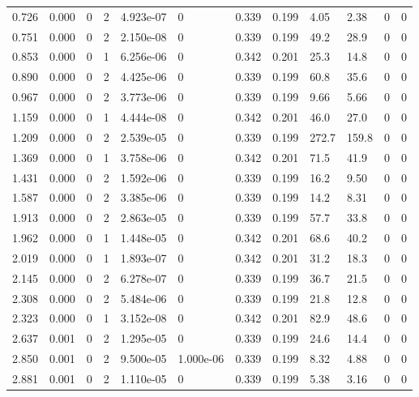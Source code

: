 \documentclass[preview]{standalone}
\begin{document}
{{\begin{tabular}{L{1.2cm}C{1.2cm} C{0.3cm}C{0.5cm} C{1.4cm}C{1.4cm} C{1.4cm}C{1.4cm} C{1.6cm}C{1.6cm} C{1.6cm}C{1.6cm}}
  0.726  &  0.000  & 0     &  2 &  4.923e-07  & 0  &  0.339&   0.199& 4.05 & 2.38   &  0 & 0  \\ 
  0.751  &  0.000  & 0     &  2 &  2.150e-08  & 0  &  0.339&   0.199& 49.2 & 28.9   &  0 & 0  \\ 
  0.853  &  0.000  & 0     &  1 &  6.256e-06  & 0  &  0.342&   0.201& 25.3 & 14.8   &  0 & 0  \\ 
  0.890  &  0.000  & 0     &  2 &  4.425e-06  & 0  &  0.339&   0.199& 60.8 & 35.6   &  0 & 0  \\ 
  0.967  &  0.000  & 0     &  2 &  3.773e-06  & 0  &  0.339&   0.199& 9.66 & 5.66   &  0 & 0  \\ 
  1.159  &  0.000  & 0     &  1 &  4.444e-08  & 0  &  0.342&   0.201& 46.0 & 27.0   &  0 & 0  \\ 
  1.209  &  0.000  & 0     &  2 &  2.539e-05  & 0  &  0.339&   0.199& 272.7 & 159.8   &  0 & 0  \\ 
  1.369  &  0.000  & 0     &  1 &  3.758e-06  & 0  &  0.342&   0.201& 71.5 & 41.9   &  0 & 0  \\ 
  1.431  &  0.000  & 0     &  2 &  1.592e-06  & 0  &  0.339&   0.199& 16.2 & 9.50   &  0 & 0  \\ 
  1.587  &  0.000  & 0     &  2 &  3.385e-06  & 0  &  0.339&   0.199& 14.2 & 8.31   &  0 & 0  \\ 
  1.913  &  0.000  & 0     &  2 &  2.863e-05  & 0  &  0.339&   0.199& 57.7 & 33.8   &  0 & 0  \\ 
  1.962  &  0.000  & 0     &  1 &  1.448e-05  & 0  &  0.342&   0.201& 68.6 & 40.2   &  0 & 0  \\ 
  2.019  &  0.000  & 0     &  1 &  1.893e-07  & 0  &  0.342&   0.201& 31.2 & 18.3   &  0 & 0  \\ 
  2.145  &  0.000  & 0     &  2 &  6.278e-07  & 0  &  0.339&   0.199& 36.7 & 21.5   &  0 & 0  \\ 
  2.308  &  0.000  & 0     &  2 &  5.484e-06  & 0  &  0.339&   0.199& 21.8 & 12.8   &  0 & 0  \\ 
  2.323  &  0.000  & 0     &  1 &  3.152e-08  & 0  &  0.342&   0.201& 82.9 & 48.6   &  0 & 0  \\ 
  2.637  &  0.001  & 0     &  2 &  1.295e-05  & 0  &  0.339&   0.199& 24.6 & 14.4   &  0 & 0  \\ 
  2.850  &  0.001  & 0     &  2 &  9.500e-05  & 1.000e-06  &  0.339&   0.199& 8.32 & 4.88   &  0 & 0  \\ 
  2.881  &  0.001  & 0     &  2 &  1.110e-05  & 0  &  0.339&   0.199& 5.38 & 3.16   &  0 & 0  \\ 

\end{tabular}}}
\end{document}
